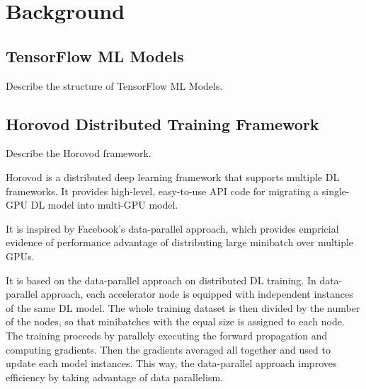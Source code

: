 \section{Background}\label{sec:background}
\subsection{TensorFlow ML Models}
Describe the structure of TensorFlow ML Models.

\subsection{Horovod Distributed Training Framework}
Describe the Horovod framework.

Horovod \cite{sergeev2018horovod} is a distributed deep learning framework
that supports multiple DL frameworks. It provides high-level, easy-to-use API
code for migrating a single-GPU DL model into multi-GPU model.

It is inspired by Facebook's data-parallel approach\cite{facebook2018},
which provides empricial evidence of performance advantage of distributing
large minibatch over multiple GPUs.

It is based on the data-parallel approach on distributed DL training.
In data-parallel approach, each accelerator node is equipped with independent
instances of the same DL model. The whole training dataset is then divided by
the number of the nodes, so that minibatches with the equal size is assigned
to each node. The training proceeds by parallely executing the forward
propagation and computing gradients. Then the gradients averaged all together
and used to update each model instances. This way, the data-parallel approach
improves efficiency by taking advantage of data parallelism.
